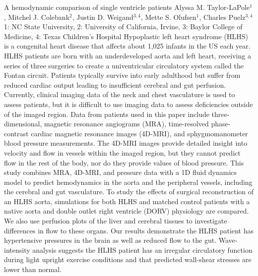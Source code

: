 \begin{addmargin}[2em]{0em}
\vspace{1.5ex}
\abs
{A hemodynamic comparison of single ventricle patients}
{Alyssa M. Taylor-LaPole$^{1}$, Mitchel J. Colebank$^{2}$, Justin D. Weigand$^{3,4}$, Mette S. Olufsen$^{1}$, Charles Puelz$^{3,4}$}
{1: NC State University, 2: University of California, Irvine, 3: Baylor College of Medicine, 4: Texas Children’s Hospital}
{Hypoplastic left heart syndrome (HLHS) is a congenital heart disease that affects about 1,025 infants in the US each year. HLHS patients are born with an underdeveloped aorta and left heart, receiving a series of three surgeries to create a univentricular circulatory system called the Fontan circuit. Patients typically survive into early adulthood but suffer from reduced cardiac output leading to insufficient cerebral and gut perfusion. Currently, clinical imaging data of the neck and chest vasculature is used to assess patients, but it is difficult to use imaging data to assess deficiencies outside of the imaged region. Data from patients used in this paper include three-dimensional, magnetic resonance angiograms (MRA), time-resolved phase-contrast cardiac magnetic resonance images (4D-MRI), and sphygmomanometer blood pressure measurements. The 4D-MRI images provide detailed insight into velocity and flow in vessels within the imaged region, but they cannot predict flow in the rest of the body, nor do they provide values of blood pressure. This study combines MRA, 4D-MRI, and pressure data with a 1D fluid dynamics model to predict hemodynamics in the aorta and the peripheral vessels, including the cerebral and gut vasculature. To study the effects of surgical reconstruction of an HLHS aorta, simulations for both HLHS and matched control patients with a native aorta and double outlet right ventricle (DORV) physiology are compared. We also use perfusion plots of the liver and cerebral tissues to investigate differences in flow to these organs. Our results demonstrate the HLHS patient has hypertensive pressures in the brain as well as reduced flow to the gut. Wave-intensity analysis suggests the HLHS patient has an irregular circulatory function during light upright exercise conditions and that predicted wall-shear stresses are lower than normal.}




\end{addmargin}

